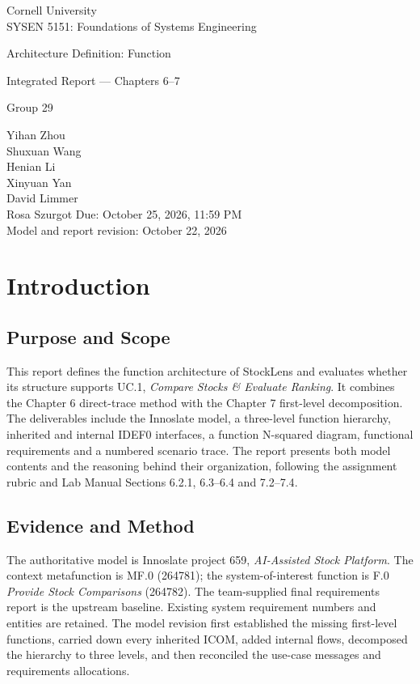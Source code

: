 \documentclass[11pt,letterpaper]{article}
\begin{document}
\begin{titlepage}\centering\vspace*{.75in}
{\large Cornell University\\SYSEN 5151: Foundations of Systems Engineering\par}
\vspace{.6in}{\Huge\bfseries StockLens\par}\vspace{.25in}
{\LARGE Architecture Definition: Function\par}\vspace{.2in}
{\Large Integrated Report --- Chapters 6--7\par}\vspace{.65in}
{\large Group 29\par}\vspace{.2in}
Yihan Zhou\\Shuxuan Wang\\Henian Li\\Xinyuan Yan\\David Limmer\\Rosa Szurgot
\vfill Due: October 25, 2026, 11:59 PM\\Model and report revision: October 22, 2026
\end{titlepage}
\tableofcontents\newpage
\section{Introduction}
\subsection{Purpose and Scope}
This report defines the function architecture of StockLens and evaluates whether its structure supports UC.1, \textit{Compare Stocks \& Evaluate Ranking}. It combines the Chapter 6 direct-trace method with the Chapter 7 first-level decomposition. The deliverables include the Innoslate model, a three-level function hierarchy, inherited and internal IDEF0 interfaces, a function N-squared diagram, functional requirements and a numbered scenario trace. The report presents both model contents and the reasoning behind their organization, following the assignment rubric and Lab Manual Sections 6.2.1, 6.3--6.4 and 7.2--7.4\cite{assignment,manual}.

\subsection{Evidence and Method}
The authoritative model is Innoslate project 659, \textit{AI-Assisted Stock Platform}. The context metafunction is MF.0 (264781); the system-of-interest function is F.0 \textit{Provide Stock Comparisons} (264782). The team-supplied final requirements report is the upstream baseline\cite{baseline}. Existing system requirement numbers and entities are retained. The model revision first established the missing first-level functions, carried down every inherited ICOM, added internal flows, decomposed the hierarchy to three levels, and then reconciled the use-case messages and requirements allocations.
\end{document}
